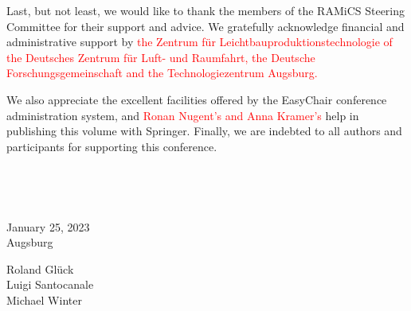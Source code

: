 \documentclass{llncs}
\newcommand{\red}[1]{\textcolor{red}{#1}}
\begin{document}
Last, but not least, we would like to thank the members of the RAMiCS
Steering Committee for their support and advice. We gratefully
acknowledge financial and administrative support by \red{the Zentrum f{\"u}r Leichtbauproduktions\-technologie of the Deutsches Zentrum f{\"u}r Luft- und Raumfahrt, the Deutsche Forschungsgemeinschaft and the Technologiezentrum Augsburg.}

We also appreciate the excellent facilities offered by the EasyChair
conference administration system, and \red{Ronan Nugent's and Anna
  Kramer's} help in publishing this volume with Springer. Finally, we
are indebted to all authors and participants for supporting this
conference.

 



~\bigskip


\noindent
\begin{minipage}[t]{.4\textwidth}
January 25, 2023\\
Augsburg
\end{minipage}%
\hfill
\begin{minipage}[t]{.4\textwidth}\flushright
  Roland Gl\"uck \\
  Luigi Santocanale\\
  Michael Winter
\end{minipage}
\end{document}
